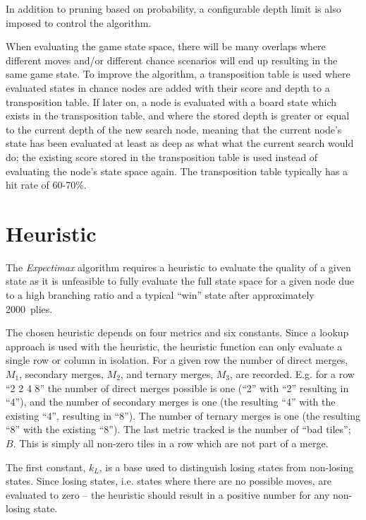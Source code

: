 In addition to pruning based on probability, a configurable depth limit is also imposed to control the algorithm.

When evaluating the game state space, there will be many overlaps where different moves and/or different chance scenarios will end up resulting in the same game state. To improve the algorithm, a transposition table is used where evaluated states in chance nodes are added with their score and depth to a transposition table. If later on, a node is evaluated with a board state which exists in the transposition table, and where the stored depth is greater or equal to the current depth of the new search node, meaning that the current node's state has been evaluated at least as deep as what what the current search would do; the existing score stored in the transposition table is used instead of evaluating the node's state space again. The transposition table typically has a hit rate of 60-70\%.

\section*{Heuristic}

The \textit{Expectimax} algorithm requires a heuristic to evaluate the quality of a given state as it is unfeasible to fully evaluate the full state space for a given node due to a high branching ratio and a typical ``win'' state after approximately 2000~plies.

The chosen heuristic depends on four metrics and six constants. Since a lookup approach is used with the heuristic, the heuristic function can only evaluate a single row or column in isolation. For a given row the number of direct merges, $M_1$, secondary merges, $M_2$, and ternary merges, $M_3$, are recorded. E.g. for a row ``2 2 4 8'' the number of direct merges possible is one (``2'' with ``2'' resulting in ``4''), and the number of secondary merges is one (the resulting ``4'' with the existing ``4'', resulting in ``8''). The number of ternary merges is one (the resulting ``8'' with the existing ``8''). The last metric tracked is the number of ``bad tiles''; $B$. This is simply all non-zero tiles in a row which are not part of a merge.

The first constant, $k_L$, is a base used to distinguish losing states from non-losing states. Since losing states, i.e. states where there are no possible moves, are evaluated to zero -- the heuristic should result in a positive number for any non-losing state.

